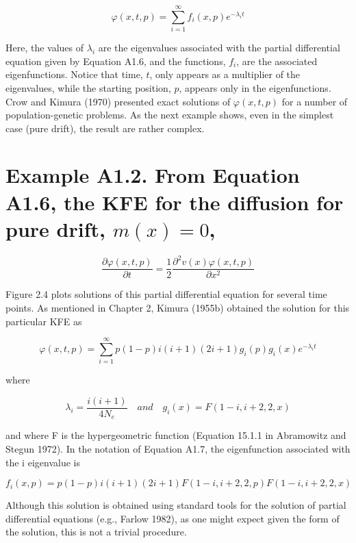 \documentclass{article}
\begin{document}
\begin{equation}
\varphi(x,t,p)=\sum_{i=1}^{\infty}f_{i}(x,p)e^{-\lambda_{i}t}
\end{equation}

Here, the values of  $ \lambda_i $ are the eigenvalues associated with the partial differential equation given by Equation A1.6, and the functions,  $ f_i $, are the associated eigenfunctions. Notice that time,  $ t $, only appears as a multiplier of the eigenvalues, while the starting position,  $ p $, appears only in the eigenfunctions. Crow and Kimura (1970) presented exact solutions of  $ \varphi(x, t, p) $ for a number of population-genetic problems. As the next example shows, even in the simplest case (pure drift), the result are rather complex.

\section{Example A1.2. From Equation A1.6, the KFE for the diffusion for pure drift,  $ m(x) = 0 $,}
\begin{equation}
\frac{\partial\varphi(x,t,p)}{\partial t}=\frac{1}{2}\frac{\partial^{2}v(x)\varphi(x,t,p)}{\partial x^{2}}
\end{equation}

Figure 2.4 plots solutions of this partial differential equation for several time points. As mentioned in Chapter 2, Kimura (1955b) obtained the solution for this particular KFE as

\begin{equation}
\varphi(x,t,p)=\sum_{i=1}^{\infty}p(1-p)i(i+1)(2i+1)g_{i}(p)g_{i}(x)e^{-\lambda_{i}t}
\end{equation}

where

\begin{equation}
\lambda_{i}=\frac{i(i+1)}{4N_{e}}\quad and\quad g_{i}(x)=F(1-i,i+2,2,x)
\end{equation}

and where F is the hypergeometric function (Equation 15.1.1 in Abramowitz and Stegun 1972). In the notation of Equation A1.7, the eigenfunction associated with the i eigenvalue is

\begin{equation}
f_{i}(x,p)=p(1-p)i(i+1)(2i+1)F(1-i,i+2,2,p)F(1-i,i+2,2,x)
\end{equation}

Although this solution is obtained using standard tools for the solution of partial differential equations (e.g., Farlow 1982), as one might expect given the form of the solution, this is not a trivial procedure.
\end{document}
